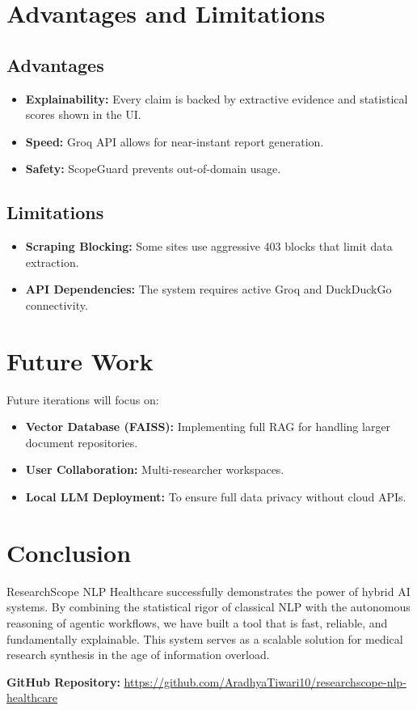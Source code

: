 \documentclass[12pt,a4paper]{article}
\begin{document}
\section{Advantages and Limitations}
\subsection{Advantages}
\begin{itemize}
    \item \textbf{Explainability:} Every claim is backed by extractive evidence and statistical scores shown in the UI.
    \item \textbf{Speed:} Groq API allows for near-instant report generation.
    \item \textbf{Safety:} ScopeGuard prevents out-of-domain usage.
\end{itemize}

\subsection{Limitations}
\begin{itemize}
    \item \textbf{Scraping Blocking:} Some sites use aggressive 403 blocks that limit data extraction.
    \item \textbf{API Dependencies:} The system requires active Groq and DuckDuckGo connectivity.
\end{itemize}

\section{Future Work}
Future iterations will focus on:
\begin{itemize}
    \item \textbf{Vector Database (FAISS):} Implementing full RAG for handling larger document repositories.
    \item \textbf{User Collaboration:} Multi-researcher workspaces.
    \item \textbf{Local LLM Deployment:} To ensure full data privacy without cloud APIs.
\end{itemize}

\section{Conclusion}
ResearchScope NLP Healthcare successfully demonstrates the power of hybrid AI systems. By combining the statistical rigor of classical NLP with the autonomous reasoning of agentic workflows, we have built a tool that is fast, reliable, and fundamentally explainable. This system serves as a scalable solution for medical research synthesis in the age of information overload.

\vspace{1cm}
\begin{center}
\textbf{GitHub Repository:} \url{https://github.com/AradhyaTiwari10/researchscope-nlp-healthcare}
\end{center}
\end{document}
